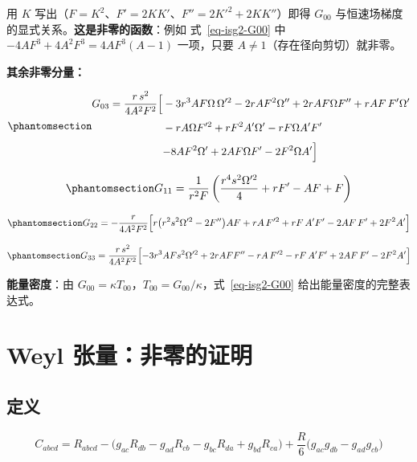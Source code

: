 \documentclass[
  chinese,
  a4paper,
  UTF8,
  12pt,
  oneside,
  openany]{ctexbook}
\theoremstyle{plain}
\theoremstyle{plain}
\theoremstyle{plain}
\theoremstyle{definition}
\theoremstyle{plain}
\theoremstyle{plain}
\theoremstyle{remark}
\begin{document}
用 \(K\) 写出（\(F=K^{2}\)、\(F'=2KK'\)、\(F''=2K'^{2}+2KK''\)）即得
\(G_{00}\) 与恒速场梯度的显式关系。\textbf{这是非零的函数}：例如
式~\ref{eq-isg2-G00} 中 \(-4AF^{3}+4A^{2}F^{3}=4AF^{3}(A-1)\) 一项，只要
\(A\neq1\)（存在径向剪切）就非零。

\textbf{其余非零分量：}

\begin{equation}\protect\phantomsection\label{eq-isg2-G03}{
\begin{aligned}
G_{03}=\frac{r\,s^{2}}{4A^{2}F^{2}}\Bigl[
&-3r^{3}AF\Omega\,\Omega'^{2}-2rAF^{2}\Omega''+2rAF\Omega F''+rAF\,F'\Omega'\Bigr.\\[3pt]
&-rA\Omega F'^{2}+rF^{2}A'\Omega'-rF\Omega A'F'\\[3pt]
&\Bigl.-8AF^{2}\Omega'+2AF\Omega F'-2F^{2}\Omega A'\Bigr]
\end{aligned}
}\end{equation}

\begin{equation}\protect\phantomsection\label{eq-isg2-G11}{
G_{11}=\frac{1}{r^{2}F}\left(\frac{r^{4}s^{2}\Omega'^{2}}{4}+rF'-AF+F\right)
}\end{equation}

\begin{equation}\protect\phantomsection\label{eq-isg2-G22}{
G_{22}=-\frac{r}{4A^{2}F^{2}}\Bigl[
r\bigl(r^{2}s^{2}\Omega'^{2}-2F''\bigr)AF+rA\,F'^{2}+rF\,A'F'-2AF\,F'+2F^{2}A'
\Bigr]
}\end{equation}

\begin{equation}\protect\phantomsection\label{eq-isg2-G33}{
G_{33}=\frac{r\,s^{2}}{4A^{2}F^{2}}\Bigl[
-3r^{3}AFs^{2}\Omega'^{2}+2rAF F''-rA\,F'^{2}-rF\,A'F'+2AF\,F'-2F^{2}A'
\Bigr]
}\end{equation}

\textbf{能量密度}：由
\(G_{00}=\kappa T_{00}\)，\(T_{00}=G_{00}/\kappa\)，式~\ref{eq-isg2-G00}
给出能量密度的完整表达式。

\section{Weyl 张量：非零的证明}\label{sec-isg2-weyl}

\subsection{定义}\label{ux5b9aux4e49-1}

\[
C_{abcd}=R_{abcd}
-\bigl(g_{ac}R_{db}-g_{ad}R_{cb}-g_{bc}R_{da}+g_{bd}R_{ca}\bigr)
+\frac{R}{6}\bigl(g_{ac}g_{db}-g_{ad}g_{cb}\bigr)
\]
\end{document}
